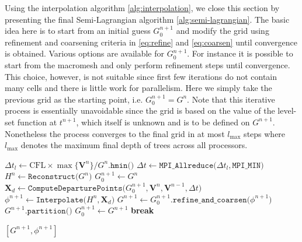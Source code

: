 Using the interpolation algorithm \ref{alg:interpolation}, we close this section by presenting the final Semi-Lagrangian algorithm \ref{alg:semi-lagrangian}. The basic idea here is to start from an initial guess $G^{n+1}_0$ and modify the grid using refinement and coarsening criteria in \eqref{eq:refine} and \eqref{eq:coarsen} until convergence is obtained. Various options are available for $G^{n+1}_0$. For instance it is possible to start from the macromesh and only perform refinement steps until convergence. This choice, however, is not suitable since first few iterations do not contain many cells and there is little work for parallelism. Here we simply take the previous grid as the starting point, i.e. $G^{n+1}_0 = G^n$. Note that this iterative process is essentially unavoidable since the grid is based on the value of the level-set function at $t^{n+1}$, which itself is unknown and is to be defined on $G^{n+1}$. Nonetheless the process converges to the final grid in at most $l_{\max}$ steps where $l_{\max}$ denotes the maximum final depth of trees across all processors.
\begin{algorithm}[htbp]
\caption{$[G^{n+1}, \phi^{n+1}] \gets \texttt{SemiLagrangian (}G^n, \phi^n, \mathbf{V}^n, \mathbf{V}^{n-1}, \text{CFL}\texttt{)}$}\label{euclid}
\begin{algorithmic}[1]
\State $\Delta t_l \gets \text{CFL} \times \max \{\mathbf{V}^n\} / G^n.\texttt{hmin()}$
\State $\Delta t   \gets \texttt{MPI\_Allreduce(}\Delta t_l,\texttt{MPI\_MIN)}$
\State $H^n \gets \texttt{Reconstruct(} G^n\texttt{)}$ 
\State $G^{n+1}_0 \gets G^n$
	\State $\mathbf{X}_d  \gets \texttt{ComputeDeparturePoints(}G^{n+1}_0, \mathbf{V}^n, \mathbf{V}^{n-1}, \Delta t\texttt{)}$ 
	\State $\phi^{n+1} \gets \texttt{Interpolate(}H^n, \textbf{X}_d\texttt{)}$
	\State $G^{n+1} \gets G^{n+1}_0.\texttt{refine\_and\_coarsen(}\phi^{n+1}\texttt{)}$ 
		\State $G^{n+1}.\texttt{partition()}$
		\State $G^{n+1}_0 \gets G^{n+1}$
	\Else
		\State \textbf{break}
	\EndIf
\EndWhile

\State \Return $[G^{n+1}, \phi^{n+1}]$
\end{algorithmic}
\label{alg:semi-lagrangian}
\end{algorithm}


